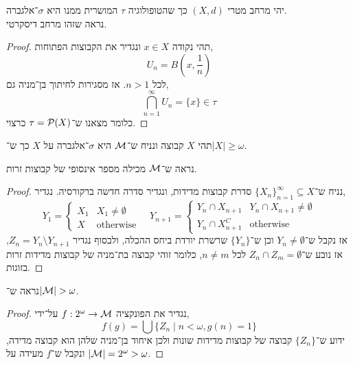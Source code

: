 \question{}
יהי מרחב מטרי $(X, d)$ כך שהטופולוגיה $\tau$ המושרית ממנו היא $\sigma$־אלגברה. \\
נראה שזהו מרחב דיסקרטי.
\begin{proof}
	תהי נקודה $x \in X$ ונגדיר את הקבוצות הפתוחות,
	\[
		U_n = B(x, \frac{1}{n})
	\]
	לכל $n > 1$.
	אז מסגירות לחיתוך בן־מניה גם,
	\[
		\bigcap_{n = 1}^{\infty} U_n
		= \{ x \}
		\in \tau
	\]
	כלומר מצאנו ש־$\tau = \mathcal{P}(X)$ כרצוי.
\end{proof}

\question{}
תהי $X$ קבוצה ונניח ש־$\mathcal{M}$ היא $\sigma$־אלגברה על $X$ כך ש־$|X| \ge \omega$.

\subquestion{}
נראה ש־$\mathcal{M}$ מכילה מספר אינסופי של קבוצות זרות.
\begin{proof}
	נניח ש־${\{ X_n \}}_{n = 1}^{\infty} \subseteq X$ סדרת קבוצות מדידות, ונגדיר סדרה חדשה ברקורסיה.
	נגדיר,
	\[
		Y_1 = \begin{cases}
			X_1 & X_1 \ne \emptyset \\
			X & \text{otherwise}
		\end{cases}
		\quad
		Y_{n + 1}
		= \begin{cases}
			Y_n \cap X_{n + 1} & Y_n \cap X_{n + 1} \ne \emptyset \\
			Y_n \cap X_{n + 1}^C & \text{otherwise}
		\end{cases}
	\]
	אז נקבל ש־$Y_n \ne \emptyset$ וכן ש־$\{ Y_n \}$ שרשרת יורדת ביחס ההכלה, ולבסוף נגדיר $Z_n = Y_n \setminus Y_{n + 1}$, אז נובע ש־$Z_n \cap Z_m = \emptyset$ לכל $n \ne m$, כלומר זוהי קבוצה בת־מניה של קבוצות מדידות זרות בזוגות.
\end{proof}

\subquestion{}
נראה ש־$|\mathcal{M}| > \omega$.
\begin{proof}
	נגדיר את הפונקציה $f : 2^{\omega} \to \mathcal{M}$ על־ידי,
	\[
		f(g) = \bigcup \{ Z_n \mid n < \omega, g(n) = 1 \}
	\]
	ידוע ש־$\{ Z_n \}$ קבוצה של קבוצות מדידות שונות ולכן איחוד בן־מניה שלהן הוא קבוצה מדידה, ונקבל ש־$f$ מעידה על $|\mathcal{M}| = 2^{\omega} > \omega$.
\end{proof}


